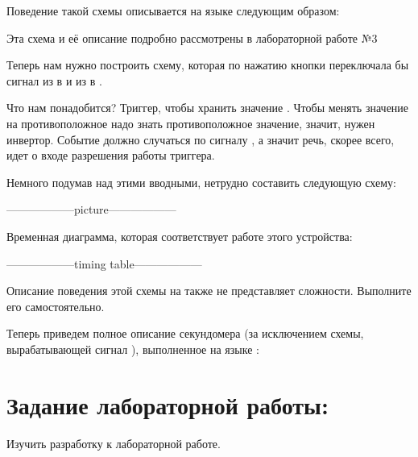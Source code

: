 {\par{Поведение такой схемы описывается на языке  следующим образом:}



\par{Эта схема и её описание подробно рассмотрены в лабораторной работе №3}

\par{Теперь нам нужно построить схему, которая по нажатию кнопки переключала бы сигнал  из  в  и из  в .}

\par{Что нам понадобится? Триггер, чтобы хранить значение . Чтобы менять значение на противоположное надо знать противоположное значение, значит, нужен инвертор. Событие должно случаться по сигналу , а значит речь, скорее всего, идет о входе разрешения работы триггера.}

\par{Немного подумав над этими вводными, нетрудно составить следующую схему:}

\par{------------------picture------------------}

\par{Временная диаграмма, которая соответствует работе этого устройства:}

\par{------------------timing table------------------}


\par{Описание поведения этой схемы на  также не представляет сложности. Выполните его самостоятельно.}

\par{Теперь приведем полное описание секундомера (за исключением схемы, вырабатывающей сигнал ), выполненное на языке :}



\section{Задание лабораторной работы:}

\par{Изучить разработку к лабораторной работе.}

}
